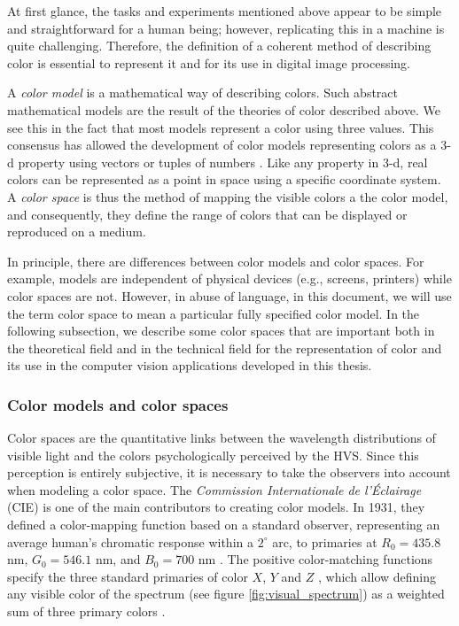 At first glance, the tasks and experiments mentioned above appear to be simple and straightforward for a human being; however, replicating this in a machine is quite challenging. Therefore, the definition of a coherent method of describing color is essential to represent it and for its use in digital image processing.

A \textit{color model} is a mathematical way of describing colors. Such abstract mathematical models are the result of the theories of color described above. We see this in the fact that most models represent a color using three values. This consensus has allowed the development of color models representing colors as a 3-d property using vectors or tuples of numbers \citep{Douglas.Kerr:Online:2005}. Like any property in 3-d, real colors can be represented as a point in space using a specific coordinate system. A \textit{color space} is thus the method of mapping the visible colors a the color model, and consequently, they define the range of colors that can be displayed or reproduced on a medium.

In principle, there are differences between color models and color spaces. For example, models are independent of physical devices (e.g., screens, printers) while color spaces are not. However, in abuse of language, in this document, we will use the term color space to mean a particular fully specified color model. In the following subsection, we describe some color spaces that are important both in the theoretical field and in the technical field for the representation of color and its use in the computer vision applications developed in this thesis.
 

\subsubsection{Color models and color spaces}
Color spaces are the quantitative links between the wavelength distributions of visible light and the colors psychologically perceived by the HVS. Since this perception is entirely subjective, it is necessary to take the observers into account when modeling a color space. The \textit{Commission Internationale de l'Éclairage} (CIE) is one of the main contributors to creating color models. In 1931, they defined a color-mapping function based on a standard observer, representing an average human's chromatic response within a $2^ \circ$ arc, to primaries at $R_0 = 435.8$ nm, $G_0 = 546.1$ nm, and $B_0 = 700$ nm \citep{Bull:Book:2014}. The positive color-matching functions specify the three standard primaries of color $X$, $Y$ and $Z$ \citep{CIE:Journal:1932}, which allow defining any visible color of the spectrum (see figure \ref{fig:visual_spectrum}) as a weighted sum of three primary colors \citep{Wright:BookCh2:2007}.


